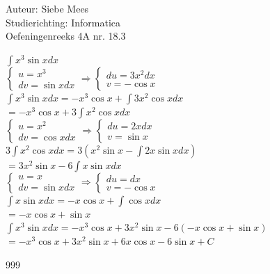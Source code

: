 \documentclass[a4paper]{article}
\begin{document}
  
\noindent \large Auteur: Siebe Mees \\
\noindent \large Studierichting: Informatica\\
\noindent \large Oefeningenreeks 4A nr. 18.3\\

\medskip

\normalsize

$ \displaystyle\int x^3 \sin x dx $\\

$ \left \{
\begin{array}{l}
u = x^3 \\
dv = \sin x dx
\end{array}
\right .
\Rightarrow
\left \{
\begin{array}{l}
du = 3x^2 dx \\
v = -\cos x
\end{array}
\right . $\\

$ \displaystyle\int x^3 \sin x dx = -x^3 \cos x + \displaystyle\int 3x^2 \cos x dx $\\

$ = -x^3 \cos x + 3 \displaystyle\int x^2 \cos x dx $\\

$ \left \{
\begin{array}{l}
u = x^2 \\
dv = \cos x dx
\end{array}
\right .
\Rightarrow
\left \{
\begin{array}{l}
du = 2x dx \\
v = \sin x
\end{array}
\right . $\\

$ 3 \displaystyle\int x^2 \cos x dx = 3 \left( x^2 \sin x - \displaystyle\int 2x \sin x dx \right) $\\

$ = 3x^2 \sin x - 6 \displaystyle\int x \sin x dx $\\

$ \left \{
\begin{array}{l}
u = x \\
dv = \sin x dx
\end{array}
\right .
\Rightarrow
\left \{
\begin{array}{l}
du = dx \\
v = -\cos x
\end{array}
\right . $\\

$ \displaystyle\int x \sin x dx = -x \cos x + \displaystyle\int \cos x dx $\\

$ = -x \cos x + \sin x $\\

$ \displaystyle\int x^3 \sin x dx = -x^3 \cos x + 3x^2 \sin x - 6 \left( -x \cos x + \sin x \right) $\\

$ = -x^3 \cos x + 3x^2 \sin x + 6x \cos x - 6 \sin x + C $\\

\begin{thebibliography}{999}
\end{thebibliography}
\end{document}
